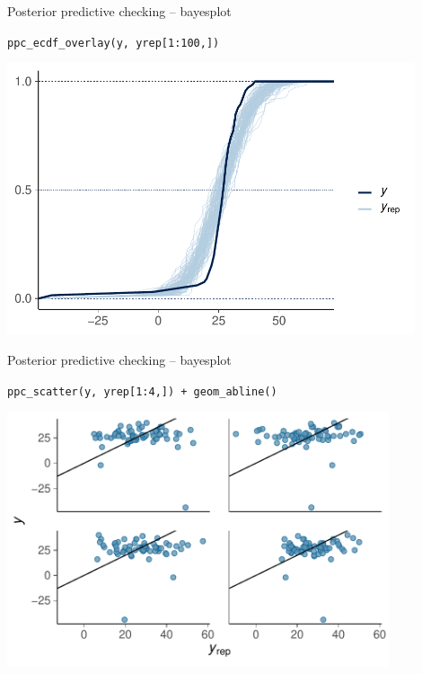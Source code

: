 \documentclass[t]{beamer}
\begin{document}
\begin{frame}{Posterior predictive checking -- bayesplot}

  \vspace{-1\baselineskip}
  \texttt{ppc\_ecdf\_overlay(y, yrep[1:100,])}
  
  \includegraphics[height=8cm]{Newcomb_ppc_ecdf_overlay.pdf}

\end{frame}

\begin{frame}{Posterior predictive checking -- bayesplot}

  \vspace{-1\baselineskip}
  \texttt{ppc\_scatter(y, yrep[1:4,]) + geom\_abline()}
  
  \includegraphics[height=7.5cm]{Newcomb_ppc_scatter.pdf}

\end{frame}
\end{document}
